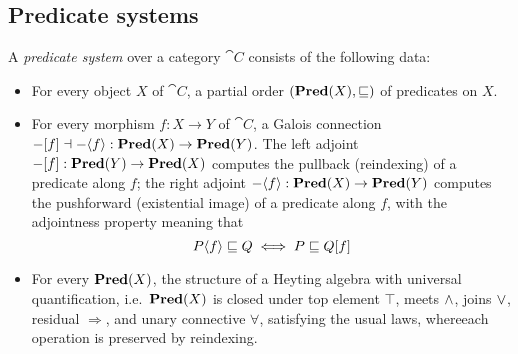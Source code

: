 \subsection{Predicate systems}
\label{sec:predicate-system}

A \emph{predicate system} over a category $\cat{C}$ consists of the following data:
\begin{itemize}
\item For every object $X$ of $\cat{C}$, a partial order $(\mathbf{Pred}(X), \sqsubseteq)$ of predicates on $X$.
\item For every morphism $f: X \to Y$ of $\cat{C}$, a Galois connection $-[f] \dashv
-\langle f\rangle : \mathbf{Pred}(X) \to \mathbf{Pred}(Y)$. The left adjoint $-[f]: \mathbf{Pred}(Y) \to \mathbf{Pred}(X)$ computes
the pullback (reindexing) of a predicate along $f$; the right adjoint $-\langle f\rangle: \mathbf{Pred}(X) \to
\mathbf{Pred}(Y)$ computes the pushforward (existential image) of a predicate along $f$, with the adjointness property
meaning that
\[P\langle f\rangle \sqsubseteq Q \iff P \sqsubseteq Q[f] \]
\item For every $\mathbf{Pred}(X)$, the structure of a Heyting algebra  with universal
   quantification, i.e.~$\mathbf{Pred}(X)$ is closed under top element $\top$, meets $\wedge$, joins $\vee$, residual
   $\Rightarrow$, and unary connective $\forall$, satisfying the usual laws, whereeach operation is preserved
   by reindexing.
\end{itemize}
